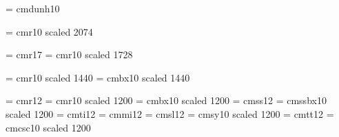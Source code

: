 




\font\tendu = cmdunh10 

\font\twentyonermsca = cmr10 scaled 2074



\font\eighteenrm= cmr17 %
\font\eighteenrmsca = cmr10 scaled 1728

\font\fourteenrmsca = cmr10 scaled 1440
\font\fourteenbfxsca = cmbx10 scaled 1440


\font\twelverm= cmr12
\font\twelvermsca = cmr10 scaled 1200
\font\twelvebfxsca = cmbx10 scaled 1200
\let\twelvebf=\twelvebfxsca
\font\twelvess  = cmss12
\font\twelvessb= cmssbx10 scaled 1200
\font\twelveit = cmti12
\font\twelvei = cmmi12
\font\twelvesl = cmsl12
\font\twelvesy = cmsy10 scaled 1200 %
\font\twelvett = cmtt12
\font\twelvesc = cmcsc10 scaled 1200 %
\let\sanss = \twelvess
\let\sanssb= \tenss
\let\twelveex=\tenex

